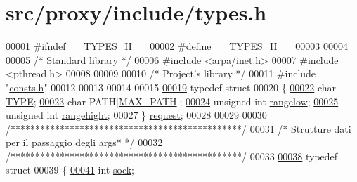 \hypertarget{types_8h_source}{
\section{src/proxy/include/types.h}
}

\begin{DoxyCode}
00001 \textcolor{preprocessor}{#ifndef \_\_TYPES\_H\_\_}
00002 \textcolor{preprocessor}{}\textcolor{preprocessor}{#define \_\_TYPES\_H\_\_}
00003 \textcolor{preprocessor}{}
00004 
00005         \textcolor{comment}{/*      Standard library        */}
00006 \textcolor{preprocessor}{#include        <arpa/inet.h>}
00007 \textcolor{preprocessor}{#include        <pthread.h>}
00008 
00009 
00010         \textcolor{comment}{/*      Project's library       */}
00011 \textcolor{preprocessor}{#include        "\hyperlink{proxy_2include_2consts_8h}{consts.h}"}
00012 
00013 
00014 
00015 
\hypertarget{types_8h_source_l00019}{}\hyperlink{structrequest}{00019} \textcolor{keyword}{typedef} \textcolor{keyword}{struct }
00020 \{
\hypertarget{types_8h_source_l00022}{}\hyperlink{structrequest_ac447850484fbd4c1c9452883f3d19a29}{00022}         \textcolor{keywordtype}{char}                    \hyperlink{structrequest_ac447850484fbd4c1c9452883f3d19a29}{TYPE};                   
\hypertarget{types_8h_source_l00023}{}\hyperlink{structrequest_a57b4438b836ceeb60da037e42ae402a2}{00023}         \textcolor{keywordtype}{char}                    PATH[\hyperlink{proxy_2include_2consts_8h_ab99ded389af74001a6298fc9e44e74e5}{MAX_PATH}]; 
\hypertarget{types_8h_source_l00024}{}\hyperlink{structrequest_ac8e95bcd354032facb72350865d93654}{00024}         \textcolor{keywordtype}{unsigned} \textcolor{keywordtype}{int}    \hyperlink{structrequest_ac8e95bcd354032facb72350865d93654}{rangelow};               
\hypertarget{types_8h_source_l00025}{}\hyperlink{structrequest_a0b27c2650c7ee47d638b89d1398177fc}{00025}         \textcolor{keywordtype}{unsigned} \textcolor{keywordtype}{int}    \hyperlink{structrequest_a0b27c2650c7ee47d638b89d1398177fc}{rangehight};             
00027 \} \hyperlink{structrequest}{request};
00028 
00029 
00030                 \textcolor{comment}{/***********************************************/}
00031                 \textcolor{comment}{/* Strutture dati per il passaggio degli args* */}
00032                 \textcolor{comment}{/***********************************************/}
00033 
\hypertarget{types_8h_source_l00038}{}\hyperlink{structmsg}{00038} \textcolor{keyword}{typedef} \textcolor{keyword}{struct }
00039 \{       
\hypertarget{types_8h_source_l00041}{}\hyperlink{structmsg_a6c8d25eefec0d18f66eabc7bf9fc272f}{00041}         \textcolor{keywordtype}{int}             \hyperlink{structmsg_a6c8d25eefec0d18f66eabc7bf9fc272f}{sock};   

\end{DoxyCode}
